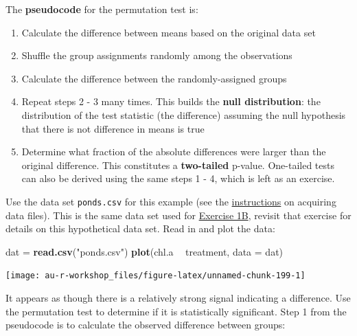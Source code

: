 \documentclass[]{book}
\newenvironment{Shaded}{\begin{snugshade}}{\end{snugshade}}
\newcommand{\KeywordTok}[1]{\textcolor[rgb]{0.13,0.29,0.53}{\textbf{#1}}}
\newcommand{\DataTypeTok}[1]{\textcolor[rgb]{0.13,0.29,0.53}{#1}}
\newcommand{\StringTok}[1]{\textcolor[rgb]{0.31,0.60,0.02}{#1}}
\newcommand{\OperatorTok}[1]{\textcolor[rgb]{0.81,0.36,0.00}{\textbf{#1}}}
\newcommand{\NormalTok}[1]{#1}
\providecommand{\tightlist}{%
  \setlength{\itemsep}{0pt}\setlength{\parskip}{0pt}}
\theoremstyle{definition}
\theoremstyle{definition}
\theoremstyle{definition}
\theoremstyle{remark}
\begin{document}
The \textbf{pseudocode} for the permutation test is:

\begin{enumerate}
\def\labelenumi{\arabic{enumi}.}
\tightlist
\item
  Calculate the difference between means based on the original data set
\item
  Shuffle the group assignments randomly among the observations
\item
  Calculate the difference between the randomly-assigned groups
\item
  Repeat steps 2 - 3 many times. This builds the \textbf{null
  distribution}: the distribution of the test statistic (the difference)
  assuming the null hypothesis that there is not difference in means is
  true
\item
  Determine what fraction of the absolute differences were larger than
  the original difference. This constitutes a \textbf{two-tailed}
  p-value. One-tailed tests can also be derived using the same steps 1 -
  4, which is left as an exercise.
\end{enumerate}

Use the data set \texttt{ponds.csv} for this example (see the
\protect\hyperlink{data-sets}{instructions} on acquiring data files).
This is the same data set used for \protect\hyperlink{ex1b}{Exercise
1B}, revisit that exercise for details on this hypothetical data set.
Read in and plot the data:

\begin{Shaded}
\begin{Highlighting}[]
\NormalTok{dat =}\StringTok{ }\KeywordTok{read.csv}\NormalTok{(}\StringTok{"ponds.csv"}\NormalTok{)}
\KeywordTok{plot}\NormalTok{(chl.a }\OperatorTok{~}\StringTok{ }\NormalTok{treatment, }\DataTypeTok{data =}\NormalTok{ dat)}
\end{Highlighting}
\end{Shaded}

\begin{center}\texttt{[image: au-r-workshop\_files/figure-latex/unnamed-chunk-199-1]} \end{center}

It appears as though there is a relatively strong signal indicating a
difference. Use the permutation test to determine if it is statistically
significant. Step 1 from the pseudocode is to calculate the observed
difference between groups:

\begin{Shaded}
\end{Shaded}
\end{document}
